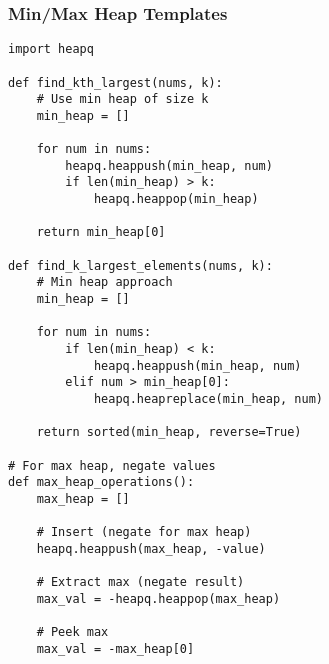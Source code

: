 \documentclass[10pt,a4paper]{article}
\begin{document}
\subsubsection{Min/Max Heap Templates}
\begin{lstlisting}
import heapq

def find_kth_largest(nums, k):
    # Use min heap of size k
    min_heap = []

    for num in nums:
        heapq.heappush(min_heap, num)
        if len(min_heap) > k:
            heapq.heappop(min_heap)

    return min_heap[0]

def find_k_largest_elements(nums, k):
    # Min heap approach
    min_heap = []

    for num in nums:
        if len(min_heap) < k:
            heapq.heappush(min_heap, num)
        elif num > min_heap[0]:
            heapq.heapreplace(min_heap, num)

    return sorted(min_heap, reverse=True)

# For max heap, negate values
def max_heap_operations():
    max_heap = []

    # Insert (negate for max heap)
    heapq.heappush(max_heap, -value)

    # Extract max (negate result)
    max_val = -heapq.heappop(max_heap)

    # Peek max
    max_val = -max_heap[0]
\end{lstlisting}
\end{document}
